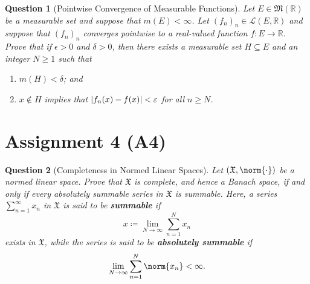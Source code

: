 \documentclass[notoc,notitlepage]{tufte-book}
\newtheorem{assgprob}{Question}[section]
\begin{document}
\begin{assgprob}[Pointwise Convergence of Measurable Functions]
  Let $E \in \mathfrak{M}(\mathbb{R})$ be a measurable set
  and suppose that $m(E) < \infty$.
  Let $(f_n)_n \in \mathcal{L}(E, \mathbb{R})$ and
  suppose that $(f_n)_n$ converges pointwise to a real-valued function
  $f : E \to \mathbb{R}$.
  Prove that if $\epsilon > 0$ and $\delta > 0$, then there exists
  a measurable set $H \subseteq E$ and an integer $N \geq 1$ such that
  \begin{enumerate}
    \item $m(H) < \delta$; and
    \item $x \notin H$ implies that $\left|f_n(x) - f(x)\right| < \varepsilon$ for all
      $n \geq N$.
  \end{enumerate}
\end{assgprob}

\newpage

\section{Assignment 4 (A4)}%
\label{sec:assignment_4}

\begin{assgprob}[Completeness in Normed Linear Spaces]
  Let $(\mathfrak{X}, \norm{\cdot})$ be a normed linear space.
  Prove that $\mathfrak{X}$ is complete, and hence a Banach space,
  if and only if every absolutely summable series in $\mathfrak{X}$ is summable.
  Here, a series $\sum_{n=1}^{\infty} x_n$ in $\mathfrak{X}$ is said
  to be \textbf{summable} if
  \begin{equation*}
    x \coloneqq \lim_{N \to \infty} \sum_{n=1}^{N} x_n
  \end{equation*}
  exists in $\mathfrak{X}$, while the series is said to be
  \textbf{absolutely summable} if
  \begin{equation*}
    \lim_{N \to \infty} \sum_{n=1}^{N} \norm{x_n} < \infty.
  \end{equation*}
\end{assgprob}
\end{document}
